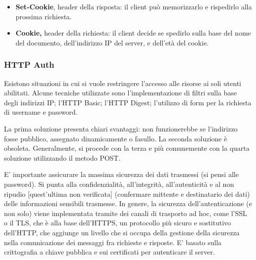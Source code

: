             \begin{itemize}
                \item
                \textbf{Set-Cookie}, header della risposta: il client può memorizzarlo e rispedirlo alla prossima richiesta.
                
                \item
                \textbf{Cookie,} header della richiesta: il client decide
                se spedirlo sulla base del nome del documento, dell’indirizzo IP del server, e dell’età del cookie.
            \end{itemize}
        
        \subsubsection{HTTP Auth}
        
            Esistono situazioni in cui si vuole restringere l’accesso alle risorse ai soli utenti abilitati. Alcune tecniche utilizzate sono l'implementazione di filtri sulla base degli indirizzi IP; l'HTTP Basic; l'HTTP Digest; l'utilizzo di form per la richiesta di username e password.
            
            \vspace{3mm}
            
            La prima soluzione presenta chiari svantaggi: non funzionerebbe se l'indirizzo fosse pubblico, assegnato dinamicamente o fasullo. La seconda soluzione è obsoleta. Generalmente, si procede con la terza e più comunemente con la quarta soluzione utilizzando il metodo POST.
            
            \vspace{3mm}
            
            E' importante assicurare la massima sicurezza dei dati trasmessi (si pensi alle password). Si punta alla confidenzialità, all'integrità, all'autenticità e al non ripudio [quest'ultima non verificata] (confermare mittente e destinatario dei dati) delle informazioni sensibili trasmesse. In genere, la sicurezza dell'autenticazione (e non solo) viene implementata tramite dei canali di trasporto ad hoc, come l'SSL o il TLS, che è alla base dell'HTTPS, un protocollo più sicuro e sostitutivo dell'HTTP, che aggiunge un livello che si occupa della gestione della sicurezza nella comunicazione dei messaggi fra richieste e risposte. E' basato sulla crittografia a chiave pubblica e sui certificati per autenticare il server.
            
